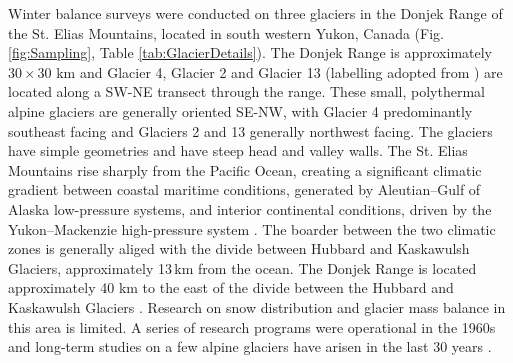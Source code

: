 \documentclass[twocolumn, letterpaper]{igs}
\begin{document}
Winter balance surveys were conducted on three glaciers in the Donjek Range of the St. Elias Mountains, located in south western Yukon, Canada (Fig. \ref{fig:Sampling}, Table \ref{tab:GlacierDetails}). The Donjek Range is approximately $30\times30$ km and Glacier 4, Glacier 2 and Glacier 13 (labelling adopted from \cite{Crompton2016}) are located along a SW-NE transect through the range. These small, polythermal alpine glaciers are generally oriented SE-NW, with Glacier 4 predominantly southeast facing and Glaciers 2 and 13 generally northwest facing. The glaciers have simple geometries and have steep head and valley walls. The St. Elias Mountains rise sharply from the Pacific Ocean, creating a significant climatic gradient between coastal maritime conditions, generated by Aleutian--Gulf of Alaska low-pressure systems, and interior continental conditions, driven by the Yukon--Mackenzie high-pressure system \citep{Taylor1969}. The boarder between the two climatic zones is generally aliged with the divide between Hubbard and Kaskawulsh Glaciers, approximately 13\,km from the ocean. The Donjek Range is located approximately 40 km to the east of the divide between the Hubbard and Kaskawulsh Glaciers \citep{Taylor1969}. Research on snow distribution and glacier mass balance in this area is limited. A series of research programs were operational in the 1960s \citep{Wood1948, Danby2003} and long-term studies on a few alpine glaciers have arisen in the last 30 years \citep[e.g.][]{Flowers2014}.
\end{document}

